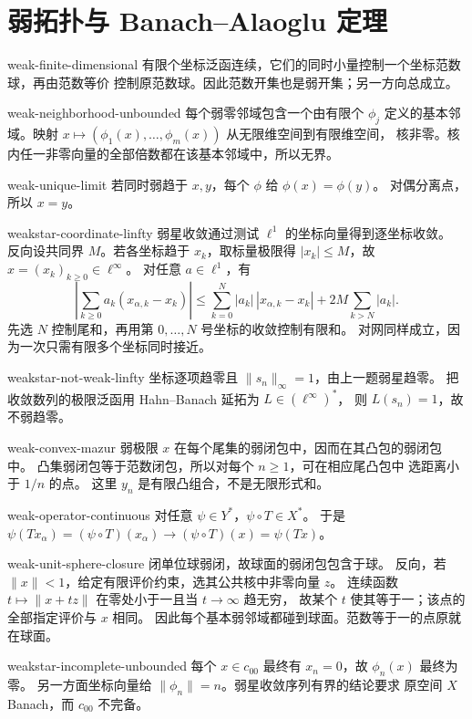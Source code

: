 \chapter{弱拓扑与 Banach--Alaoglu 定理}
\begin{solution}{weak-finite-dimensional}
有限个坐标泛函连续，它们的同时小量控制一个坐标范数球，再由范数等价
控制原范数球。因此范数开集也是弱开集；另一方向总成立。
\end{solution}
\begin{solution}{weak-neighborhood-unbounded}
每个弱零邻域包含一个由有限个 \(\phi_j\) 定义的基本邻域。映射
\(x\mapsto(\phi_1(x),\ldots,\phi_m(x))\) 从无限维空间到有限维空间，
核非零。核内任一非零向量的全部倍数都在该基本邻域中，所以无界。
\end{solution}
\begin{solution}{weak-unique-limit}
若同时弱趋于 \(x,y\)，每个 \(\phi\) 给 \(\phi(x)=\phi(y)\)。
对偶分离点，所以 \(x=y\)。
\end{solution}
\begin{solution}{weakstar-coordinate-linfty}
弱星收敛通过测试 \(\ell^1\) 的坐标向量得到逐坐标收敛。
反向设共同界 \(M\)。若各坐标趋于 \(x_k\)，取标量极限得
\(|x_k|\le M\)，故 \(x=(x_k)_{k\ge0}\in\ell^\infty\)。
对任意 \(a\in\ell^1\)，有
\[
 \left|\sum_{k\ge0}a_k(x_{\alpha,k}-x_k)\right|
 \le \sum_{k=0}^N|a_k|\,|x_{\alpha,k}-x_k|
       +2M\sum_{k>N}|a_k|.
\]
先选 \(N\) 控制尾和，再用第 \(0,\ldots,N\) 号坐标的收敛控制有限和。
对网同样成立，因为一次只需有限多个坐标同时接近。
\end{solution}
\begin{solution}{weakstar-not-weak-linfty}
坐标逐项趋零且 \(\|s_n\|_\infty=1\)，由上一题弱星趋零。
把收敛数列的极限泛函用 Hahn--Banach 延拓为 \(L\in(\ell^\infty)^*\)，
则 \(L(s_n)=1\)，故不弱趋零。
\end{solution}
\begin{solution}{weak-convex-mazur}
弱极限 \(x\) 在每个尾集的弱闭包中，因而在其凸包的弱闭包中。
凸集弱闭包等于范数闭包，所以对每个 \(n\ge1\)，可在相应尾凸包中
选距离小于 \(1/n\) 的点。
这里 \(y_n\) 是有限凸组合，不是无限形式和。
\end{solution}
\begin{solution}{weak-operator-continuous}
对任意 \(\psi\in Y^*\)，\(\psi\circ T\in X^*\)。
于是 \(\psi(Tx_\alpha)=(\psi\circ T)(x_\alpha)\to(\psi\circ T)(x)=\psi(Tx)\)。
\end{solution}
\begin{solution}{weak-unit-sphere-closure}
闭单位球弱闭，故球面的弱闭包包含于球。
反向，若 \(\|x\|<1\)，给定有限评价约束，选其公共核中非零向量 \(z\)。
连续函数 \(t\mapsto\|x+tz\|\) 在零处小于一且当 \(t\to\infty\) 趋无穷，
故某个 \(t\) 使其等于一；该点的全部指定评价与 \(x\) 相同。
因此每个基本弱邻域都碰到球面。范数等于一的点原就在球面。
\end{solution}
\begin{solution}{weakstar-incomplete-unbounded}
每个 \(x\in c_{00}\) 最终有 \(x_n=0\)，故 \(\phi_n(x)\) 最终为零。
另一方面坐标向量给 \(\|\phi_n\|=n\)。弱星收敛序列有界的结论要求
原空间 \(X\) Banach，而 \(c_{00}\) 不完备。
\end{solution}
